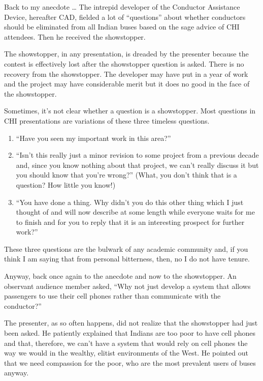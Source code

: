 Back to my anecdote \ldots{} The intrepid developer of the Conductor
Assistance Device, hereafter CAD, fielded a lot of ``questions'' about
whether conductors should be eliminated from all Indian buses based on
the sage advice of CHI attendees. Then he received the showstopper.

The showstopper, in any presentation, is dreaded by the presenter
because the contest is effectively lost after the showstopper question
is asked. There is no recovery from the showstopper. The developer may
have put in a year of work and the project may have considerable merit
but it does no good in the face of the showstopper.

Sometimes, it's not clear whether a question is a showstopper. Most
questions in CHI presentations are variations of these three timeless
questions.

\begin{enumerate}
\def\labelenumi{\arabic{enumi}.}
\item
  ``Have you seen my important work in this area?''
\item
  ``Isn't this really just a minor revision to some project from a
  previous decade and, since you know nothing about that project, we
  can't really discuss it but you should know that you're wrong?''
  (What, you don't think that is a question? How little you know!)
\item
  ``You have done a thing. Why didn't you do this other thing which I
  just thought of and will now describe at some length while everyone
  waits for me to finish and for you to reply that it is an interesting
  prospect for further work?''
\end{enumerate}

These three questions are the bulwark of any academic community and, if
you think I am saying that from personal bitterness, then, no I do not
have tenure.

Anyway, back once again to the anecdote and now to the showstopper. An
observant audience member asked, ``Why not just develop a system that
allows passengers to use their cell phones rather than communicate with
the conductor?''

The presenter, as so often happens, did not realize that the showstopper
had just been asked. He patiently explained that Indians are too poor to
have cell phones and that, therefore, we can't have a system that would
rely on cell phones the way we would in the wealthy, elitist
environments of the West. He pointed out that we need compassion for the
poor, who are the most prevalent users of buses anyway.

